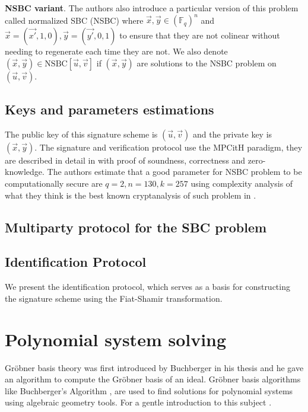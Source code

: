 \documentclass[english]{article}
\begin{document}
		\textbf{NSBC variant}.
		The authors also introduce a particular version of this problem called normalized SBC (NSBC) where $\vec{x}, \vec{y} \in (\mathbb{F}_q)^n$ and
		$\vec{x} = (\vec{x'}, 1, 0), \vec{y} = (\vec{y'}, 0, 1)$ to ensure that they are not colinear without needing to regenerate each time they are not. We also denote $(\vec{x}, \vec{y}) \in \text{NSBC}[\vec{u}, \vec{v}]$ if $(\vec{x}, \vec{y})$ are solutions to the NSBC problem on $(\vec{u}, \vec{v})$.
		
		\subsection{Keys and parameters estimations}
		The public key of this signature scheme is $(\vec{u},\vec{v})$ and the private key is $(\vec{x}, \vec{y})$.
		The signature and verification protocol use the MPCitH paradigm, they are described in detail in \cite{HJ23} with proof of soundness, correctness and zero-knowledge.
		The authors estimate that a good parameter for NSBC problem to be computationally secure are $q = 2, n = 130, k = 257$ using complexity analysis of what they think is the best known cryptanalysis of such problem in \cite{FSS11}.
		
		\subsection{Multiparty protocol for the SBC problem}
		
		
		
		\subsection{Identification Protocol}
		We present the identification protocol, which serves as a basis for constructing the signature scheme using the Fiat-Shamir transformation.
		
		
		
	\section{Polynomial system solving}\label{sec3}
		Gröbner basis theory was first introduced by Buchberger in his thesis \cite{Buc} and he gave an algorithm to compute the Gröbner basis of an ideal.
		Gröbner basis algorithms like Buchberger's Algorithm \cite{Buc}, are used to find solutions for polynomial systems using algebraic geometry tools. For a gentle introduction to this subject \cite{CLS}.
		
\end{document}
